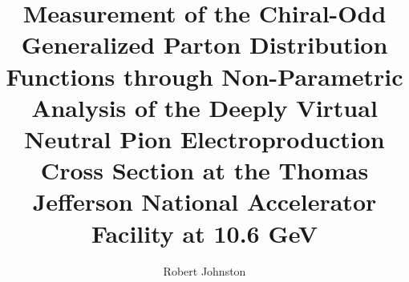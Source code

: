 % 
% 
%
%
%
%
%
%
%
%
% 
% 

\title{Measurement of the Chiral-Odd Generalized Parton Distribution Functions through Non-Parametric Analysis of the Deeply Virtual Neutral Pion Electroproduction Cross Section at the Thomas Jefferson National Accelerator Facility at 10.6 GeV}

\author{Robert Johnston}


